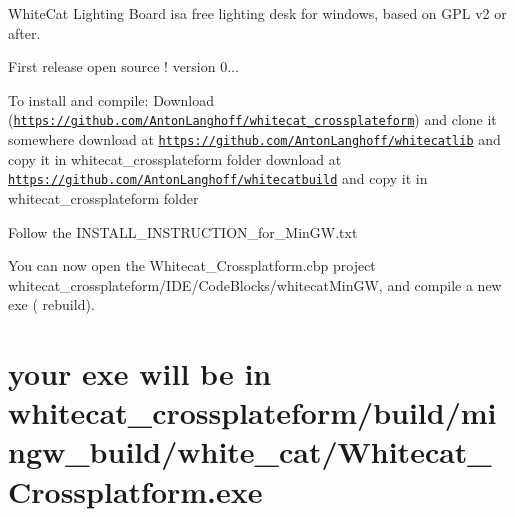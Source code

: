 White\-Cat Lighting Board isa free lighting desk for windows, based on G\-P\-L v2 or after.

First release open source ! version 0...

To install and compile\-: Download (\href{https://github.com/AntonLanghoff/whitecat_crossplateform}{\tt https\-://github.\-com/\-Anton\-Langhoff/whitecat\-\_\-crossplateform}) and clone it somewhere download at \href{https://github.com/AntonLanghoff/whitecatlib}{\tt https\-://github.\-com/\-Anton\-Langhoff/whitecatlib} and copy it in whitecat\-\_\-crossplateform folder download at \href{https://github.com/AntonLanghoff/whitecatbuild}{\tt https\-://github.\-com/\-Anton\-Langhoff/whitecatbuild} and copy it in whitecat\-\_\-crossplateform folder

Follow the I\-N\-S\-T\-A\-L\-L\-\_\-\-I\-N\-S\-T\-R\-U\-C\-T\-I\-O\-N\-\_\-for\-\_\-\-Min\-G\-W.\-txt

You can now open the Whitecat\-\_\-\-Crossplatform.\-cbp project whitecat\-\_\-crossplateform/\-I\-D\-E/\-Code\-Blocks/whitecat\-Min\-G\-W, and compile a new exe ( rebuild). \section*{your exe will be in whitecat\-\_\-crossplateform/build/mingw\-\_\-build/white\-\_\-cat/\-Whitecat\-\_\-\-Crossplatform.\-exe }